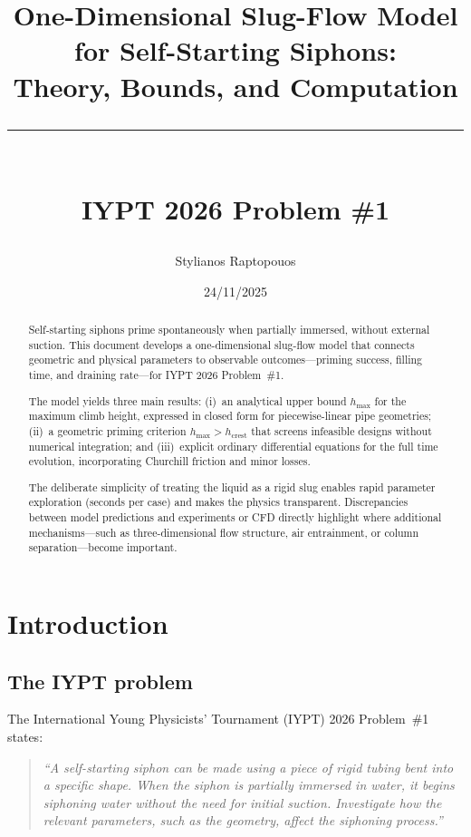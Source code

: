 \documentclass[11pt]{article}
\title{One-Dimensional Slug-Flow Model for Self-Starting Siphons:\\
       Theory, Bounds, and Computation\\[0.5em]
       \rule{\textwidth}{0.4pt}\\[0.5em]
       \large IYPT 2026 Problem \#1}
\author{Stylianos Raptopouos}
\date{24/11/2025}
\theoremstyle{definition}
\begin{document}
\maketitle

\begin{abstract}
Self-starting siphons prime spontaneously when partially immersed, without external suction. 
This document develops a one-dimensional slug-flow model that connects geometric and physical 
parameters to observable outcomes---priming success, filling time, and draining rate---for 
IYPT 2026 Problem~\#1.

The model yields three main results: (i)~an analytical upper bound $h_{\max}$ for the maximum 
climb height, expressed in closed form for piecewise-linear pipe geometries; (ii)~a geometric 
priming criterion $h_{\max} > h_{\text{crest}}$ that screens infeasible designs without 
numerical integration; and (iii)~explicit ordinary differential equations for the full 
time evolution, incorporating Churchill friction and minor losses.

The deliberate simplicity of treating the liquid as a rigid slug enables rapid parameter 
exploration (seconds per case) and makes the physics transparent. Discrepancies between 
model predictions and experiments or CFD directly highlight where additional mechanisms---such 
as three-dimensional flow structure, air entrainment, or column separation---become important.
\end{abstract}

\tableofcontents
\newpage

\section{Introduction}
\label{sec:intro}

\subsection{The IYPT problem}

The International Young Physicists' Tournament (IYPT) 2026 Problem~\#1 states:
\begin{quote}
\emph{``A self-starting siphon can be made using a piece of rigid tubing bent into a specific 
shape. When the siphon is partially immersed in water, it begins siphoning water without the 
need for initial suction. Investigate how the relevant parameters, such as the geometry, 
affect the siphoning process.''}
\end{quote}
\end{document}
